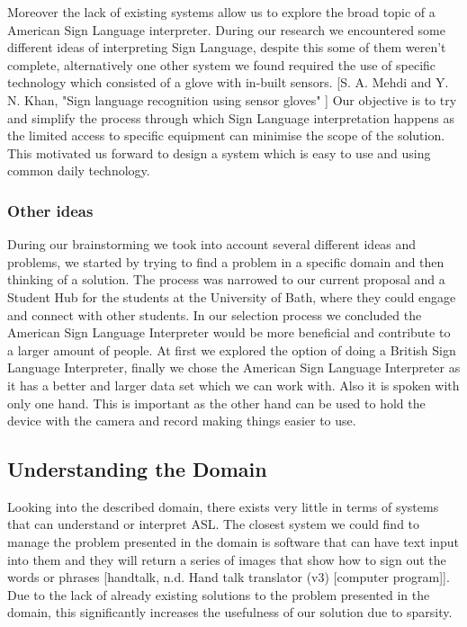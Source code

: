 \documentclass[10pt]{article}
\begin{document}
  Moreover the lack of existing systems allow us to explore the broad topic of a American Sign 
  Language interpreter. During our research we encountered some different ideas of interpreting Sign 
  Language, despite this some of them weren't complete, alternatively one other system we found 
  required the use of specific technology which consisted of a glove with in-built sensors. [S. A. 
  Mehdi and Y. N. Khan, "Sign language recognition using sensor gloves" ] Our objective is to try 
  and simplify the process through which Sign Language interpretation happens as the limited access 
  to specific equipment can minimise the scope of the solution. This motivated us forward to design 
  a system which is easy to use and using common daily technology. 

  \subsubsection{Other ideas}

  During our brainstorming we took into account several different ideas and problems, we started by 
  trying to find a problem in a specific domain and then thinking of a solution. The process was 
  narrowed to our current proposal and a Student Hub for the students at the University of Bath, 
  where they could engage and connect with other students. In our selection process we concluded the 
  American Sign Language Interpreter would be more beneficial and contribute to a larger amount of 
  people. At first we explored the option of doing a British Sign Language Interpreter, finally we 
  chose the American Sign Language Interpreter as it has a better and larger data set which we can 
  work with. Also it is spoken with only one hand. This is important as the other hand can be used 
  to hold the device with the camera and record making things easier to use.

  \subsection{Understanding the Domain}

  Looking into the described domain, there exists very little in terms of systems that can 
  understand or interpret ASL. The closest system we could find to manage the problem presented in 
  the domain is software that can have text input into them and they will return a series of images 
  that show how to sign out the words or phrases [handtalk, n.d. Hand talk translator (v3) [computer 
  program]]. Due to the lack of already existing solutions to the problem presented in the domain, 
  this significantly increases the usefulness of our solution due to sparsity.
\end{document}
